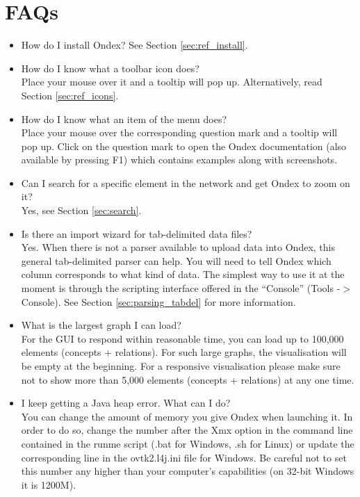 \chapter{FAQs}
\label{cha:faqs}

\begin{itemize}
\item How do I install Ondex?
See Section \ref{sec:ref_install}.

\item How do I know what a toolbar icon does?\\
Place your mouse over it and a tooltip will pop up. Alternatively, read Section \ref{sec:ref_icons}.

\item How do I know what an item of the menu does?\\
Place your mouse over the corresponding question mark and a tooltip will pop up. 
Click on the question mark to open the Ondex documentation (also available by pressing F1) which contains examples along with screenshots.

\item Can I search for a specific element in the network and get Ondex to zoom on it?\\
Yes, see Section \ref{sec:search}.

\item Is there an import wizard for tab-delimited data files?\\
Yes. When there is not a parser available to upload data into Ondex, this general tab-delimited parser can help. 
You will need to tell Ondex which column corresponds to what kind of data. 
The simplest way to use it at the moment is through the scripting interface offered in the ``Console'' (Tools -$>$ Console). 
See Section \ref{sec:parsing_tabdel} for more information.

\item What is the largest graph I can load?\\
For the GUI to respond within reasonable time, you can load up to 100,000 elements (concepts + relations). 
For such large graphs, the visualisation will be empty at the beginning. 
For a responsive visualisation please make sure not to show more than 5,000 elements (concepts + relations) at any one time.

\item I keep getting a Java heap error. What can I do?\\
You can change the amount of memory you give Ondex when launching it. 
In order to do so, change the number after the Xmx option in the command line contained in the runme script (.bat for Windows, .sh for Linux)
or update the corresponding line in the ovtk2.l4j.ini file for Windows. 
Be careful not to set this number any higher than your computer's capabilities (on 32-bit Windows it is 1200M).


\end{itemize}
